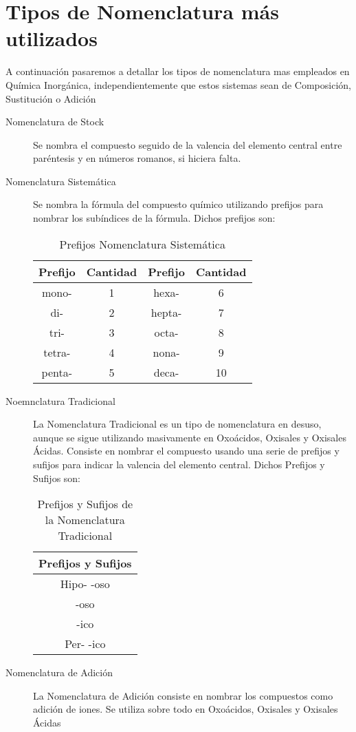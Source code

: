 \section{Tipos de Nomenclatura más utilizados}
A continuación pasaremos a detallar los tipos de nomenclatura mas empleados en Química Inorgánica, independientemente que estos sistemas sean de Composición, Sustitución o Adición\\
\begin{description}
	\item [Nomenclatura de Stock] Se nombra el compuesto seguido de la valencia del elemento central entre paréntesis y en números romanos, si hiciera falta.
	\item[Nomenclatura Sistemática] Se nombra la fórmula del compuesto químico utilizando prefijos para nombrar los subíndices de la fórmula. Dichos prefijos son:\\
	\begin{table}[h!]
		\centering
		\label{tab:nomsist}
		\begin{tabular}{c c|c c}
			Prefijo&Cantidad&Prefijo&Cantidad\\ \hline
			mono-&1&hexa-&6\\ 
			di-&2&hepta-&7\\ 
			tri-&3&octa-&8\\ 
			tetra-&4&nona-&9\\
			penta-&5&deca-&10\\ \hline
		\end{tabular}
		\caption{Prefijos Nomenclatura Sistemática}
	\end{table}
	\item[Noemnclatura Tradicional] La Nomenclatura Tradicional es un tipo de nomenclatura en desuso, aunque se sigue utilizando masivamente en Oxoácidos, Oxisales y Oxisales Ácidas. Consiste en nombrar el compuesto usando una serie de prefijos y sufijos para indicar la valencia del elemento central. Dichos Prefijos y Sufijos son:
	\begin{table}[h!]
		\centering
		\label{tab:nomtrad}
		\begin{tabular}{c}
			Prefijos y Sufijos\\ \hline
			Hipo- -oso\\
			-oso\\
			-ico\\
			Per- -ico\\ \hline
		\end{tabular}
	\caption{Prefijos y Sufijos de la Nomenclatura Tradicional}
	\end{table}
	\item[Nomenclatura de Adición] La Nomenclatura de Adición consiste en nombrar los compuestos como adición de iones. Se utiliza sobre todo en Oxoácidos, Oxisales y Oxisales Ácidas
\end{description}

